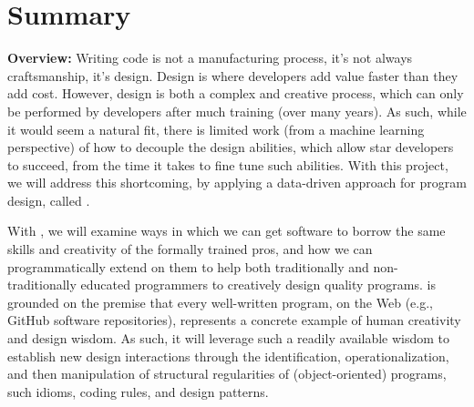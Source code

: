 
\setcounter{section}{1}
\section{Summary \mytitle}

%


{\bf{Overview:}}
%
Writing code is not a manufacturing process, it's not 
always craftsmanship, it's design. Design is where developers add 
value faster than they add cost. However, design is both a complex 
and creative process, which can only be performed by developers after 
much training (over many years). As such, while it would seem a natural 
fit, there is limited work (from a machine learning perspective) 
of how to decouple the design abilities, which allow star developers to 
succeed, from the time it takes to fine tune such abilities. With this 
project, we will address this shortcoming, by applying a data-driven 
approach for program design, called \pdm. 

With \pdm, we will examine ways in which we can get software to borrow 
the same skills and creativity of the formally trained pros, and how 
we can programmatically extend on them to help both traditionally and 
non-traditionally educated programmers to creatively design quality programs. 
\pdm is grounded on the premise that every well-written program, on the 
Web (e.g., GitHub software repositories), represents a concrete example 
of human creativity and design wisdom. As such, it will leverage such a 
readily available wisdom to establish new design interactions through the  
identification, operationalization, and then manipulation of structural 
regularities of (object-oriented) programs, such idioms, coding rules, 
and design patterns.


